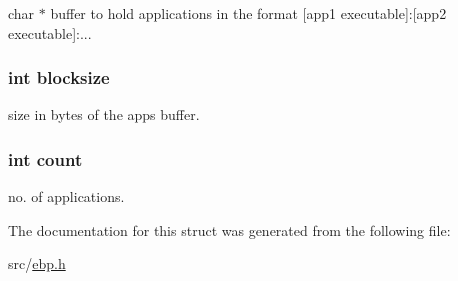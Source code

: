 char $\ast$ buffer to hold applications in the format \mbox{[}app1 executable\mbox{]}\-:\mbox{[}app2 executable\mbox{]}\-:... 

\hypertarget{struct_apps_data_a75e9073defcedf91712de41e4ac14800}{
\subsubsection[{blocksize}]{\setlength{\rightskip}{0pt plus 5cm}int {\bf blocksize}}}\label{struct_apps_data_a75e9073defcedf91712de41e4ac14800}


size in bytes of the apps buffer. 

\hypertarget{struct_apps_data_ad43c3812e6d13e0518d9f8b8f463ffcf}{
\subsubsection[{count}]{\setlength{\rightskip}{0pt plus 5cm}int {\bf count}}}\label{struct_apps_data_ad43c3812e6d13e0518d9f8b8f463ffcf}


no. of applications. 



\-The documentation for this struct was generated from the following file\-:\begin{DoxyCompactItemize}
\item 
src/\hyperlink{ebp_8h}{ebp.\-h}\end{DoxyCompactItemize}

